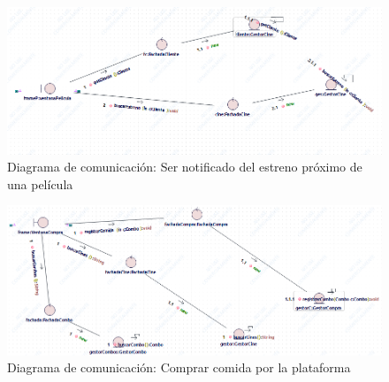 \begin{figure}[h!]
\centering
\includegraphics[width=1\linewidth]{diseno/requerimientos/imgs/EstrenoCom}
	\caption{Diagrama de comunicación: Ser notificado del estreno próximo de una película}
\end{figure}
\begin{figure}[h!]
\centering
\includegraphics[width=1\linewidth]{diseno/requerimientos/imgs/compraCombosCom}
	\caption{Diagrama de comunicación: Comprar comida por la plataforma}
\end{figure}
